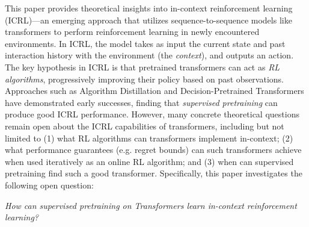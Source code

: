 \documentclass[10pt]{article}
\newcommand{\<}{\left\langle}
\renewcommand{\>}{\right\rangle}
\newcommand{\authnote}[2]{{\scriptsize $\ll$\textsf{#1 notes: #2}$\gg$}}
\newcommand{\authnote}[2]{}
\newcommand{\yub}[1]{{\color{red}\authnote{Yu}{#1}}}
\begin{document}


This paper provides theoretical insights into in-context reinforcement learning (ICRL)---an emerging approach that utilizes sequence-to-sequence models like transformers to perform reinforcement learning in newly encountered environments. In ICRL, the model takes as input the current state and past interaction history with the environment (the \emph{context}), and outputs an action. The key hypothesis in ICRL is that pretrained transformers can act as \emph{RL algorithms}, progressively improving their policy based on past observations. Approaches such as Algorithm Distillation \citep{laskin2022context} and Decision-Pretrained Transformers \citep{lee2023supervised} have demonstrated early successes, finding that \emph{supervised pretraining} can produce good ICRL performance. However, many concrete theoretical questions remain open about the ICRL capabilities of transformers, including but not limited to (1) what RL algorithms can transformers implement in-context; (2) what performance guarantees (e.g. regret bounds) can such transformers achieve when used iteratively as an online RL algorithm; and (3) when can supervised pretraining find such a good transformer. Specifically, this paper investigates the following open question:
\begin{center}
\emph{How can supervised pretraining on Transformers learn in-context reinforcement learning?}
\end{center}
\end{document}
